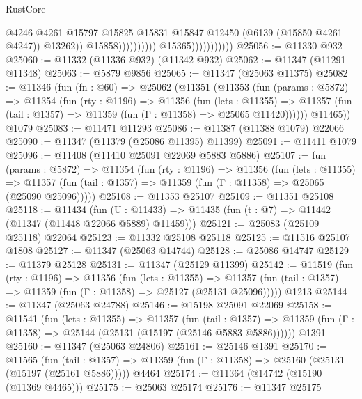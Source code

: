 \begin{lexlean}{RustCore}
\begin{coremodule}
                                                  @4246
                                                  @4261
                                                  @15797
                                                  @15825
                                                  @15831
                                                  @15847
                                                  @12450
                                                  (@6139 (@15850 @4261 @4247))
                                                  @13262))
                                              @15858))))))))))
                          @15365)))))))))))
@25056 := @11330 @932
@25060 := @11332 (@11336 @932) (@11342 @932)
@25062 := @11347 (@11291 @11348)
@25063 := @5879 @9856
@25065 := @11347 (@25063 @11375)
@25082 := @11346
    (fun (fn : @60) =>
    @25062
      (@11351
        (@11353
          (fun (params : @5872) =>
          @11354
            (fun (rty : @1196) =>
            @11356
              (fun (lets : @11355) =>
              @11357 (fun (tail : @1357) => @11359 (fun (Γ : @11358) => @25065 @11420))))))
        @11465))
    @1079
@25083 := @11471 @11293
@25086 := @11387 (@11388 @1079) @22066
@25090 := @11347 (@11379 (@25086 @11395) @11399)
@25091 := @11411 @1079
@25096 := @11408 (@11410 @25091 @22069 @5883 @5886)
@25107 := fun (params : @5872) =>
  @11354
    (fun (rty : @1196) =>
    @11356
      (fun (lets : @11355) =>
      @11357 (fun (tail : @1357) => @11359 (fun (Γ : @11358) => @25065 (@25090 @25096)))))
@25108 := @11353 @25107
@25109 := @11351 @25108
@25118 := @11434
    (fun (U : @11433) => @11435 (fun (t : @7) => @11442 (@11347 (@11448 @22066 @5889) @11459)))
@25121 := @25083 (@25109 @25118) @22064
@25123 := @11332 @25108 @25118
@25125 := @11516 @25107 @1808
@25127 := @11347 (@25063 @14744)
@25128 := @25086 @14747
@25129 := @11379 @25128
@25131 := @11347 (@25129 @11399)
@25142 := @11519
    (fun (rty : @1196) =>
    @11356
      (fun (lets : @11355) =>
      @11357 (fun (tail : @1357) => @11359 (fun (Γ : @11358) => @25127 (@25131 @25096)))))
    @1213
@25144 := @11347 (@25063 @24788)
@25146 := @15198 @25091 @22069
@25158 := @11541
    (fun (lets : @11355) =>
    @11357
      (fun (tail : @1357) =>
      @11359 (fun (Γ : @11358) => @25144 (@25131 (@15197 (@25146 @5883 @5886))))))
    @1391
@25160 := @11347 (@25063 @24806)
@25161 := @25146 @1391
@25170 := @11565
    (fun (tail : @1357) => @11359 (fun (Γ : @11358) => @25160 (@25131 (@15197 (@25161 @5886)))))
    @4464
@25174 := @11364 (@14742 (@15190 (@11369 @4465)))
@25175 := @25063 @25174
@25176 := @11347 @25175

\end{coremodule}
\end{lexlean}
